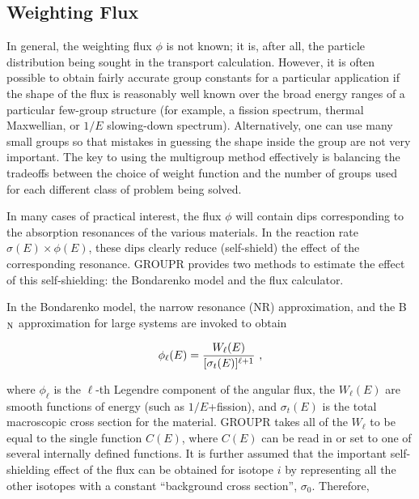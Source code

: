 \subsection{Weighting Flux}
\label{ssGROUPR_WtFlux}

In general, the weighting flux $\phi$ is not
known; it is, after all, the particle distribution being sought
in the transport calculation.  However, it is often possible
to obtain fairly accurate group constants for a particular
application if the shape of the flux is reasonably well known
over the broad energy ranges of a particular few-group structure
(for example, a fission spectrum, thermal Maxwellian, or $1/E$
slowing-down spectrum). Alternatively, one can use many small groups
so that mistakes in guessing the shape inside the group are not very
important.  The key to using the multigroup method effectively is
balancing the tradeoffs between the choice of weight function and
the number of groups used for each different class of problem being solved.

In many cases of practical interest, the flux $\phi$ will contain dips
corresponding to the absorption resonances of the various materials.
In the reaction rate $\sigma(E)\times\phi(E)$, these dips clearly reduce
(self-shield) the effect of the corresponding resonance.  GROUPR provides
two methods to estimate the effect of this self-shielding: the Bondarenko
model and the flux calculator.

In the Bondarenko model\cite{Bondarenko}, the narrow resonance (NR)
approximation, and the
B$_{\rm N}$ approximation for large systems\cite{ref5} are invoked
to obtain

  \begin{equation}
    \phi_{\ell}(E)={{W_{\ell}(E)}\over{[\sigma_t(E)]^{\ell+1}}}\,\,,
  \end{equation}

\noindent
where $\phi_{\ell}$ is the $\ell$-th Legendre component of the angular
flux, the $W_\ell(E)$ are smooth functions of energy (such as $1/E$+fission),
and $\sigma_t(E)$ is the total macroscopic cross section for the material.
GROUPR takes all of the $W_{\ell}$ to be equal to the single function $C(E)$,
where $C(E)$ can be read in or set to one of several internally defined
functions.  It is further assumed that the important self-shielding effect
of the flux can be obtained for isotope $i$ by representing all the other
isotopes with a constant ``background cross section'', $\sigma_0$.  Therefore,

